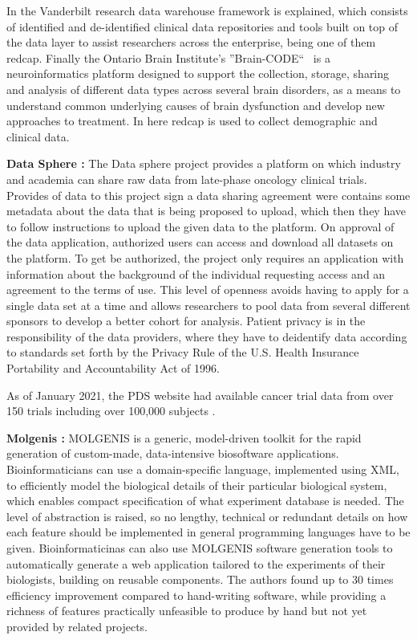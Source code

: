 In \cite{vanderbilt} the Vanderbilt research data warehouse framework is explained,
which consists of identified and de-identified clinical data repositories and tools
built on top of the data layer to assist researchers across the enterprise, being one
of them \gls{redcap}.
Finally the Ontario Brain Institute’s ''Brain-CODE``~\cite{braincode} is a
neuroinformatics platform designed to support the collection, storage, sharing and
analysis of different data types across several brain disorders, as a means to
understand common underlying causes of brain dysfunction and develop new approaches to
treatment.
In here \gls{redcap} is used to collect demographic and clinical data.

\textbf{Data Sphere \cite{datasphere}:}
The Data sphere project provides a platform on which industry and academia can share
raw data from late-phase oncology clinical trials.
Provides of data to this project sign a data sharing agreement were contains some
metadata about the data that is being proposed to upload, which then they have to
follow instructions to upload the given data to the platform.
On approval of the data application, authorized users can access and download all
datasets on the platform.
To get be authorized, the project only requires an application with information about
the background of the individual requesting access and an agreement to the terms of
use.
This level of openness avoids having to apply for a single data set at a time and
allows researchers to pool data from several different sponsors to develop a better
cohort for analysis.
Patient privacy is in the responsibility of the data providers, where they have to
deidentify data according to standards set forth by the Privacy Rule of the U.S. Health
Insurance Portability and Accountability Act of 1996.

As of January 2021, the PDS website had available cancer trial data from over 150
trials including over 100,000 subjects \cite{datasphere-site}.

\textbf{Molgenis \cite{molgenis}:}
MOLGENIS is a generic, model-driven toolkit for the rapid generation of custom-made,
data-intensive biosoftware applications.
Bioinformaticians can use a domain-specific language, implemented using XML, to
efficiently model the biological details of their particular biological system, which
enables compact specification of what experiment database is needed.
The level of abstraction is raised, so no lengthy, technical or redundant details on
how each feature should be implemented in general programming languages have to be
given.
Bioinformaticinas can also use MOLGENIS software generation tools to automatically
generate a web application tailored to the experiments of their biologists, building on
reusable components.
The authors found up to 30 times efficiency improvement compared to hand-writing
software, while providing a richness of features practically unfeasible to produce by
hand but not yet provided by related projects.


